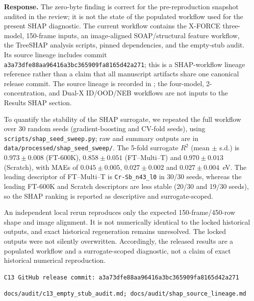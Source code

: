 \documentclass[11pt,a4paper]{article}
\begin{document}
\noindent\textbf{Response.}
    The zero-byte finding is correct for the pre-reproduction snapshot audited in the review; it is not the state of the populated workflow used for the present SHAP diagnostic. The current workflow contains the X-FORCE three-model, 150-frame inputs, an image-aligned SOAP/structural feature workflow, the TreeSHAP analysis scripts, pinned dependencies, and the empty-stub audit. Its source lineage includes commit \texttt{a3a73dfe88aa96416a3bc3659\allowbreak{}09fa8165d42a271}; this is a SHAP-workflow lineage reference rather than a claim that all manuscript artifacts share one canonical release commit. The source lineage is recorded in ; the four-model, 2-concentration, and Dual-X ID/OOD/NEB workflows are not inputs to the Results SHAP section.

To quantify the stability of the SHAP surrogate, we repeated the full workflow over 30 random seeds (gradient-boosting and CV-fold seeds), using \texttt{scripts/shap\_seed\_sweep.py}; raw and summary outputs are in \texttt{data/processed/shap\_seed\_sweep/}. The 5-fold surrogate $R^2$ (mean $\pm$ s.d.) is $0.973\pm0.008$ (FT-600K), $0.858\pm0.051$ (FT--Multi--T) and $0.970\pm0.013$ (Scratch), with MAEs of $0.045\pm0.005$, $0.027\pm0.002$ and $0.027\pm0.004$~eV. The leading descriptor of FT--Multi--T is \texttt{Cr-Sb\_n43\_l0} in 30/30 seeds, whereas the leading FT-600K and Scratch descriptors are less stable (20/30 and 19/30 seeds), so the SHAP ranking is reported as descriptive and surrogate-scoped.

An independent local rerun reproduces only the expected 150-frame/450-row shape and image alignment. It is not numerically identical to the locked historical outputs, and exact historical regeneration remains unresolved. The locked outputs were not silently overwritten. Accordingly, the released results are a populated workflow and a surrogate-scoped diagnostic, not a claim of exact historical numerical reproduction.

\begin{center}
\texttt{C13 GitHub release commit: a3a73dfe88aa96416a3bc365909fa8165d42a271}
\end{center}

\begin{center}
\texttt{docs/audit/c13\_empty\_stub\_audit.md; docs/audit/shap\_source\_lineage.md}
\end{center}
\end{document}
